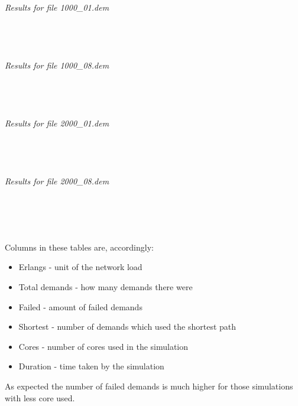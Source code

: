 \documentclass[conference]{IEEEtran}
\begin{document}
\begin{footnotesize}
\noindent \noindent \textit{Results for file 1000\_01.dem} \\
\\\\
\\\\

\noindent \textit{Results for file 1000\_08.dem} \\ 
\\\\
\\\\

\noindent \textit{Results for file 2000\_01.dem} \\
\\\\
\\\\

\noindent \textit{Results for file 2000\_08.dem} \\
\\\\
\\\\
\end{footnotesize}
Columns in these tables are, accordingly: 
\begin{itemize}
\item Erlangs - unit of the network load
\item Total demands - how many demands there were
\item Failed - amount of failed demands
\item Shortest - number of demands which used the shortest path
\item Cores - number of cores used in the simulation
\item Duration - time taken by the simulation
\end{itemize}

As expected the number of failed demands is much higher for those simulations with less core used.\\
\end{document}

